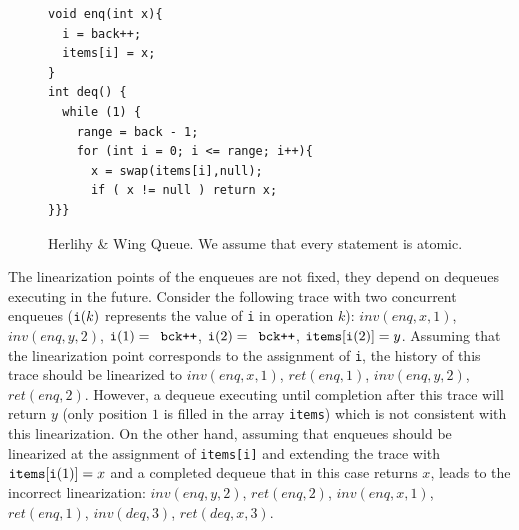 \begin{figure}
\vspace{-9mm}
\begin{lstlisting}
void enq(int x){
  i = back++;
  items[i] = x;
}
int deq() {
  while (1) {
    range = back - 1;
    for (int i = 0; i <= range; i++){
      x = swap(items[i],null);
      if ( x != null ) return x;
}}}
  \end{lstlisting}
\vspace{-5.5mm}
\caption{Herlihy \& Wing Queue. We assume that every statement is atomic.}
\label{fig:HerlihyWing}
\vspace{-6mm}
\end{figure}
The linearization points of the enqueues are not fixed, they depend on dequeues executing in the future. Consider the following trace with two concurrent enqueues (${\tt i}(k)$ represents the value of {\tt i} in operation $k$): $inv(enq,x,1)$, $inv(enq,y,2)$, ${\tt i}(1) = \mbox{{\tt bck++}}$, ${\tt i}(2) = \mbox{{\tt bck++}}$, ${\tt items[i(}2{\tt )]} = y$.
Assuming that the linearization point corresponds to the assignment of {\tt i}, the history of this trace should be linearized to $inv(enq,x,1)$, $ret(enq,1)$, $inv(enq,y,2)$, $ret(enq,2)$. However, a dequeue executing until completion after this trace will return $y$ (only position $1$ is filled in the array {\tt items}) which is not consistent with this linearization. On the other hand, assuming that enqueues should be linearized at the assignment of {\tt items[i]} and extending the trace with ${\tt items[i(}1{\tt )]} = x$ and a completed dequeue that in this case returns $x$, leads to the incorrect linearization: $inv(enq,y,2)$, $ret(enq,2)$, $inv(enq,x,1)$, $ret(enq,1)$, $inv(deq,3)$, $ret(deq,x,3)$.

